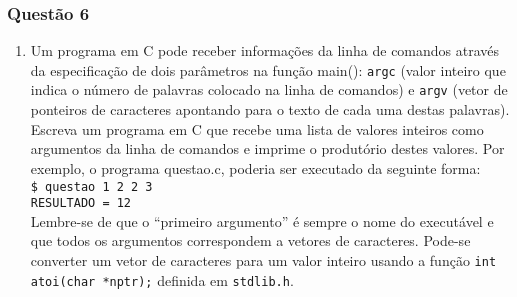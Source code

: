 \documentclass[aspectratio=169]{beamer}
\newcommand\setItemnumber[1]{\setcounter{enumi}{\numexpr#1-1\relax}}
\begin{document}
\begin{frame}\frametitle{Questão 6}
\begin{enumerate}
\setItemnumber{6}
\item Um programa em C pode receber informações da linha de comandos através da especificação de dois parâmetros na função main(): \texttt{argc} (valor inteiro que indica o número de palavras colocado na linha de comandos) e \texttt{argv} (vetor de ponteiros de caracteres apontando para o texto de cada uma destas palavras). Escreva um programa em C que recebe uma lista de valores inteiros como argumentos da linha de comandos e imprime o produtório destes valores. Por exemplo, o programa questao.c, poderia ser executado da seguinte forma:\\
\texttt{\$ questao 1 2 2 3\\
RESULTADO = 12}\\
Lembre-se de que o ``primeiro argumento'' é sempre o nome do executável e que todos os argumentos correspondem a vetores de caracteres. Pode-se converter um vetor de caracteres para um valor inteiro usando a função \texttt{int atoi(char *nptr);} definida em \texttt{stdlib.h}.

\end{enumerate}
\end{frame}

\end{document}

